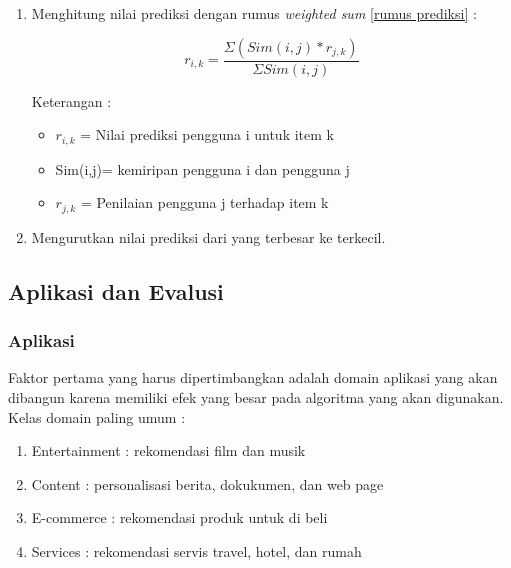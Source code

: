 \begin{enumerate}
	\item Menghitung nilai prediksi dengan rumus \textit{weighted sum} \cite{jurnal:hitung:prediksi} \ref{rumus prediksi} :
	

	\begin{equation}
		r_{i,k} = \frac{\Sigma (Sim(i,j)*r_{j,k}) }{\Sigma Sim(i,j)}
		\label{rumus prediksi}
	\end{equation}		
		
	Keterangan :
	\begin{itemize}
		\item $r_{i,k}$ = Nilai prediksi pengguna i untuk item k
		
		\item Sim(i,j)= kemiripan pengguna i dan pengguna j
		
		\item $r_{j,k} $ = Penilaian pengguna j terhadap item k
		
		
		
	\end{itemize}\leavevmode
	
	\item Mengurutkan nilai prediksi dari yang terbesar ke terkecil. %
	 
\end{enumerate}\leavevmode

\subsection{Aplikasi dan Evalusi}
\label{sec:aplikasi dan evaluasi}
\subsubsection{Aplikasi}
Faktor pertama yang harus dipertimbangkan adalah domain aplikasi yang akan dibangun karena memiliki efek yang besar pada algoritma yang akan digunakan. Kelas domain paling umum : %
\begin{enumerate}
	\item Entertainment : rekomendasi film dan musik
	\item Content : personalisasi berita, dokukumen, dan web page
	\item E-commerce : rekomendasi produk untuk di beli
	\item Services : rekomendasi servis travel, hotel, dan rumah
\end{enumerate}

